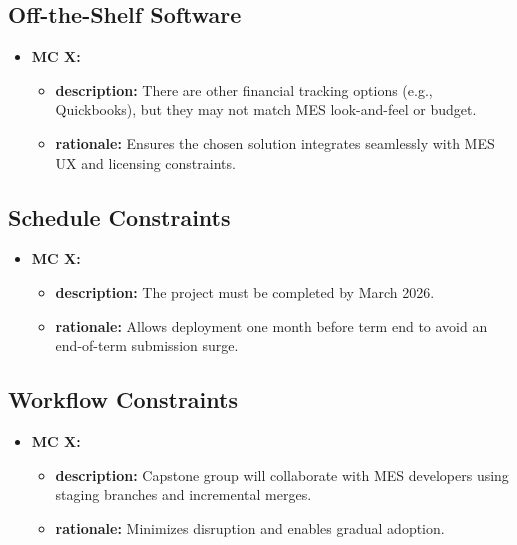 \documentclass[12pt]{article}
\begin{document}
\subsection{Off-the-Shelf Software}
  \begin{itemize}
    \item \textbf{MC X:}
      \begin{itemize}[label=$\circ$]
        \item \textbf{description:} There are other financial tracking options (e.g., Quickbooks), but they may not match MES look-and-feel or budget.
        \item \textbf{rationale:} Ensures the chosen solution integrates seamlessly with MES UX and licensing constraints.
      \end{itemize}
  \end{itemize}

\subsection{Schedule Constraints}
  \begin{itemize}
    \item \textbf{MC X:}
      \begin{itemize}[label=$\circ$]
        \item \textbf{description:} The project must be completed by March 2026.
        \item \textbf{rationale:} Allows deployment one month before term end to avoid an end-of-term submission surge.
      \end{itemize}
  \end{itemize}

\subsection{Workflow Constraints}
  \begin{itemize}
    \item \textbf{MC X:}
      \begin{itemize}[label=$\circ$]
        \item \textbf{description:} Capstone group will collaborate with MES developers using staging branches and incremental merges.
        \item \textbf{rationale:} Minimizes disruption and enables gradual adoption.
      \end{itemize}
  \end{itemize}
\end{document}
